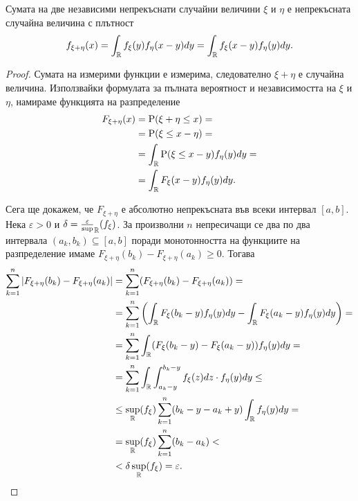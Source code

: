 \documentclass[numbers=endperiod, bibliography=totocnumbered]{scrartcl}
\begin{document}
\begin{proposition}\label{thm:convolution}
  Сумата на две независими непрекъснати случайни величини \( \xi \) и \( \eta \) е непрекъсната случайна величина с плътност
  \begin{align*}
    f_{\xi + \eta} (x)
    =
    \int_{\mathbb{R}} f_\xi(y) f_\eta(x - y) dy
    =
    \int_{\mathbb{R}} f_\xi(x - y) f_\eta(y) dy.
  \end{align*}
\end{proposition}
\begin{proof} Сумата на измерими функции е измерима, следователно \( \xi + \eta \) е случайна величина. Използвайки формулата за пълната вероятност и независимостта на \( \xi \) и \( \eta \), намираме функцията на разпределение
  \begin{align*}
    F_{\xi + \eta} (x)
    &=
    \operatorname{P}(\xi + \eta \leq x)
    = \\ &=
    \operatorname{P}(\xi \leq x - \eta)
    = \\ &=
    \int_{\mathbb{R}} \operatorname{P}(\xi \leq x - y) f_\eta(y) dy
    = \\ &=
    \int_{\mathbb{R}} F_\xi(x - y) f_\eta(y) dy.
  \end{align*}

  Сега ще докажем, че \( F_{\xi + \eta} \) е абсолютно непрекъсната във всеки интервал \( [a, b] \). Нека \( \varepsilon > 0 \) и \( \delta = \frac \varepsilon \sup_{\mathbb{R}}(f_\xi) \). За произволни \( n \) непресичащи се два по два интервала \( (a_k, b_k) \subseteq [a, b] \) поради монотонността на функциите на разпределение имаме \( F_{\xi+\eta} (b_k) - F_{\xi+\eta}(a_k) \geq 0 \). Тогава
  \begin{align*}
    \sum_{k=1}^n \left\vert F_{\xi+\eta} (b_k) - F_{\xi+\eta}(a_k) \right\vert
    &=
    \sum_{k=1}^n (F_{\xi+\eta} (b_k) - F_{\xi+\eta}(a_k))
    = \\ &=
    \sum_{k=1}^n \left(\int_{\mathbb{R}} F_\xi(b_k - y) f_\eta(y) dy - \int_{\mathbb{R}} F_\xi(a_k - y) f_\eta(y) dy \right)
    = \\ &=
    \sum_{k=1}^n \int_{\mathbb{R}} (F_\xi(b_k - y) - F_\xi(a_k - y)) f_\eta(y) dy
    = \\ &=
    \sum_{k=1}^n \int_{\mathbb{R}} \int_{a_k - y}^{b_k - y} f_\xi(z) dz \cdot f_\eta(y) dy
    \leq \\ &\leq
    \sup_{\mathbb{R}}(f_\xi) \sum_{k=1}^n (b_k - y - a_k + y) \int_{\mathbb{R}} f_\eta(y) dy
    = \\ &=
    \sup_{\mathbb{R}}(f_\xi) \sum_{k=1}^n (b_k - a_k)
    < \\ &<
    \delta \sup_{\mathbb{R}}(f_\xi)
    =
    \varepsilon.
  \end{align*}


\end{proof}
\end{document}
